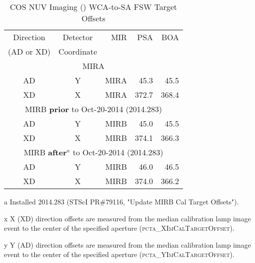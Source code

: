 \begin{center}
\begin{table}
	\begin{threeparttable}
	\caption{COS NUV Imaging () WCA-to-SA FSW Target Offsets}
	\centering
		\begin{tabular*}{14cm}{ccrrr}
		Direction & Detector & MIR  &	PSA	&	BOA\\
		(AD or XD) & Coordinate &	&	&	\\
		\hline
		\hline
		\multicolumn{5}{c}{MIRA}\\
		\hline
		AD	&	Y	&	MIRA	&	45.3	&	45.5 \\
		XD	&	X	&	MIRA	&	372.7	&	368.4 \\
		\hline
		\multicolumn{5}{c}{MIRB {\bf prior} to Oct-20-2014 (2014.283)}\\
		\hline
		AD	&	Y	&	MIRB	&	45.0	&	45.5 \\
		XD	&	X	&	MIRB	&	374.1	&	366.3 \\
		\hline
		\multicolumn{5}{c}{MIRB {\bf after}$^{a}$ to Oct-20-2014 (2014.283)}\\
		\hline
		AD	&	Y	&	MIRB	&	46.0	&	46.5 \\
		XD	&	X	&	MIRB	&	374.0	&	366.2 \\
		\hline
		\end{tabular*}
		\label{tab:pctaWCA2SANIM}
		\begin{tablenotes}
			\item[a] Installed 2014.283 (STScI PR\#79116, "Update MIRB Cal Target Offsets").
			\item[x] X (XD) direction offsets are measured from the median calibration lamp image event to the center of the specified aperture (\textsc{pcta\_XImCalTargetOffset}).
			\item[y] Y (AD) direction offsets are measured from the median calibration lamp image event to the center of the specified aperture (\textsc{pcta\_YImCalTargetOffset}).
		\end{tablenotes}
	\end{threeparttable}
\end{table}
\end{center}
